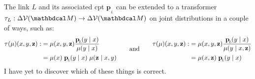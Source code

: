 \documentclass{article}
\newcommand{\bp}[1][L]{\mathbf{p}_{\!_#1\!}}
\newcommand{\V}{\mathcal V}
\newcommand{\dg}[1]{\mathbdcal #1}
\begin{document}
	The link $L$ and its associated cpt $\bp$ can be extended to a transformer $\tau_L: \Delta \V(\dg M) \to \Delta \V(\dg M)$ on joint distributions in a couple of ways, such as:
\[
	\begin{aligned}
		\tau(\mu)(x,y,\mat z) :&= \mu(x,y,\mat z)\frac{\bp(y \mid x)}{\mu(y\mid x)} \\
		&= \mu(x)\; \bp(y \mid x)\; \mu(\mat z \mid x,y) 
	\end{aligned}\qquad\text{and}\qquad
	\begin{aligned}
		\tau(\mu)(x,y,\mat z) :&= \mu(x,y,\mat z) \frac{\bp(y \mid x)}{\mu(y\mid x, \mathbf z)} \\
		&= \mu(x,\mat z)\; \bp(y \mid x)
	\end{aligned}\\
\]
	I have yet to discover which of these things is correct. 
%	

		
	
	
\end{document}

